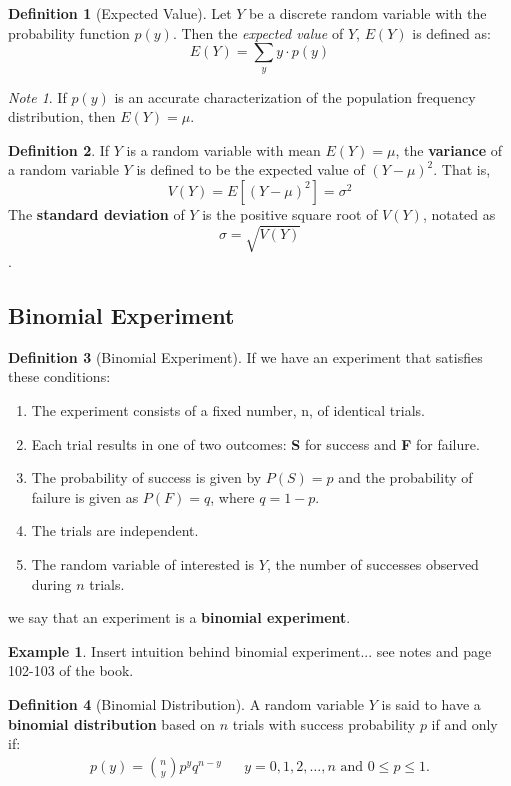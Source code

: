 \documentclass{article}
\theoremstyle{plain}
\theoremstyle{definition}
\newtheorem{defn}{Definition}[section]
\newtheorem{example}{Example}[section]
\theoremstyle{remark}
\newtheorem*{note}{Note}
\begin{document}
\begin{defn}[Expected Value] 
Let $Y$ be a discrete random variable with the probability function $p(y)$. Then the \textit{expected value} of $Y$, $E(Y)$ is defined as:
$$
E(Y) = \displaystyle \sum_{y}y\cdot p(y)
$$
\end{defn}

\begin{note}
If $p(y)$ is an accurate characterization of the population frequency distribution, then $E(Y) = \mu$.
\end{note}

\begin{defn}
If $Y$ is a random variable with mean $E(Y) = \mu$, the \textbf{variance} of a random variable $Y$ is defined to be the expected value of $(Y - \mu)^2$. That is,
$$
V(Y) = E[(Y - \mu)^2] = \sigma^2
$$
The \textbf{standard deviation} of $Y$ is the positive square root of $V(Y)$, notated as $$
\sigma = \sqrt{V(Y)}
$$.
\end{defn}

\subsection{Binomial Experiment}
\begin{defn}[Binomial Experiment]  If we have an experiment that satisfies these conditions:
  \begin{enumerate}
    \item The experiment consists of a fixed number, n, of identical trials.
    \item Each trial results in one of two outcomes: \textbf{S} for success and \textbf{F} for failure.
    \item The probability of success is given by $P(S) = p$ and the probability of failure is given as $P(F) = q$, where $q = 1 - p$.
    \item The trials are independent.
    \item The random variable of interested is $Y$, the number of successes observed during $n$ trials.
  \end{enumerate}
  we say that an experiment is a \textbf{binomial experiment}.
\end{defn}

\begin{example}
Insert intuition behind binomial experiment... see notes and page 102-103 of the book.
\end{example}

\begin{defn}[Binomial Distribution] 
A random variable $Y$ is said to have a \textbf{binomial distribution} based on $n$ trials with success probability $p$ if and only if:
\begin{align*}
p(y) = {n \choose y} p^y q^{n-y} && y = 0,1,2,\ldots ,n\text{ and }0 \leq p \leq 1.
\end{align*}
\end{defn}
\end{document}

